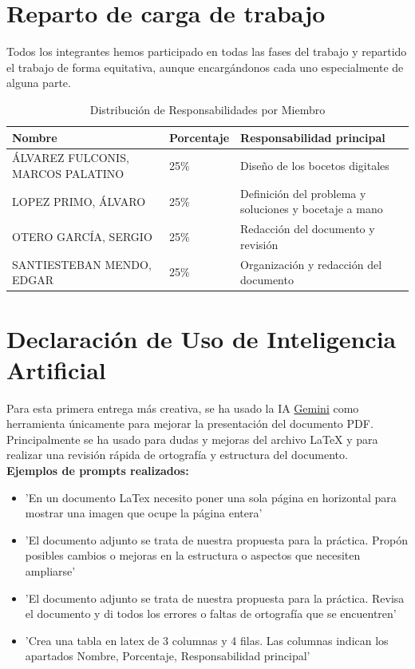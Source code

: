 \documentclass[10pt]{article}
\begin{document}
	\newpage
	\section{Reparto de carga de trabajo}
	Todos los integrantes hemos participado en todas las fases del trabajo y repartido el trabajo de forma equitativa, aunque encargándonos cada uno especialmente de alguna parte.\\
	
	\begin{table}[h]
		\centering
		\caption{Distribución de Responsabilidades por Miembro}
		\begin{tabularx}{\textwidth}{llX} %
			\toprule
			\textbf{Nombre} & \textbf{Porcentaje} & \textbf{Responsabilidad principal} \\
			\midrule
			ÁLVAREZ FULCONIS, MARCOS PALATINO      	& 25\%                & Diseño de los bocetos digitales \\
			LOPEZ PRIMO, ÁLVARO      				& 25\%                & Definición del problema y soluciones y bocetaje a mano\\
			OTERO GARCÍA, SERGIO     				& 25\%                & Redacción del documento y revisión\\
			SANTIESTEBAN MENDO, EDGAR    			& 25\%                & Organización y redacción del documento\\
			\bottomrule
		\end{tabularx}
	\end{table}
	
	
	\section{Declaración de Uso de Inteligencia Artificial}
	Para esta primera entrega más creativa, se ha usado la IA \href{https://gemini.google.com/share/938828584764}{Gemini} como herramienta únicamente para mejorar la presentación del documento PDF. \\
	Principalmente se ha usado para dudas y mejoras del archivo LaTeX y para realizar una revisión rápida de ortografía y estructura del documento.\\
	
	\textbf{Ejemplos de prompts realizados:}
	\begin{itemize}
		\item 'En un documento LaTex necesito poner una sola página en horizontal para mostrar una imagen que ocupe la página entera'
		\item 'El documento adjunto se trata de nuestra propuesta para la práctica. Propón posibles cambios o mejoras en la estructura o aspectos que necesiten ampliarse'
		\item 'El documento adjunto se trata de nuestra propuesta para la práctica. Revisa el documento y di todos los errores o faltas de ortografía que se encuentren'
		\item 'Crea una tabla en latex de 3 columnas y 4 filas.
		Las columnas indican los apartados Nombre, Porcentaje, Responsabilidad principal'
	\end{itemize}
	
\end{document}
